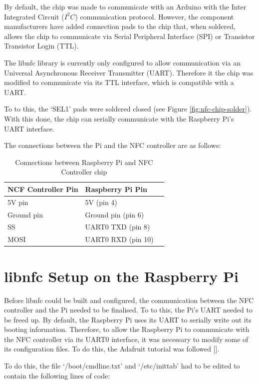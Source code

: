 By default, the chip was made to communicate with an Arduino with the Inter
Integrated Circuit ($I^2C$) communication protocol. However, the component
manufacturers have added connection pads to the chip that, when soldered, allows
the chip to communicate via Serial Peripheral Interface (SPI) or Transistor
Transistor Login (TTL). 

The libnfc library is currently only configured to allow communication via an
Universal Asynchronous Receiver Transmitter (UART). Therefore it the chip was
modified to communicate via its TTL interface, which is compatible with a UART. 

To to this, the `SEL1' pads were soldered closed (see Figure
\ref{fig:nfc-chip-solder}). With this done, the chip can serially communicate
with the Raspberry Pi's UART interface.

The connections between the Pi and the NFC controller are as follows: 

\begin{table}[h] 
\centering
 \caption{Connections between Raspberry Pi and NFC Controller chip}
 \begin{tabular}{|l|l|l|}
  \hline
  \textbf{NCF Controller Pin} & \textbf{Raspberry Pi Pin}\\\hline\hline
  5V pin & 5V (pin 4) \\\hline
  Ground pin & Ground pin (pin 6) \\\hline
  SS & UART0 TXD (pin 8) \\\hline
  MOSI & UART0 RXD (pin 10) \\\hline
 \end{tabular}
\end{table}

\section{libnfc Setup on the Raspberry Pi}

Before libnfc could be built and configured, the communication between the NFC
controller and the Pi needed to be finalised. To to this, the Pi's UART needed
to be freed up. By default, the Raspberry Pi uses its UART to serially write out
its booting information. Therefore, to allow the Raspberry Pi to communicate
with the NFC controller via its UART0 interface, it was necessary to modify
some of its configuration files. To do this, the Adafruit tutorial was followed
[\cite{website:adafruit-tutorial}].

To do this, the file `/boot/cmdline.txt' and `/etc/inittab' had to be edited to
contain the following lines of code:\\\\

